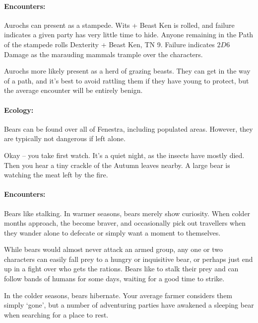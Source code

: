 \begin{multicols}{2}
\begin{boxtext}
\end{boxtext}

\paragraph{Encounters:} Aurochs can present as a stampede.  Wits + Beast Ken is rolled, and failure indicates a given party has very little time to hide.  Anyone remaining in the Path of the stampede rolls Dexterity + Beast Ken, TN 9.  Failure indicates $2D6$ Damage as the marauding mammals trample over the characters.

Aurochs more likely present as a herd of grazing beasts.  They can get in the way of a path, and it's best to avoid rattling them if they have young to protect, but the average encounter will be entirely benign.

\label{bear}

\paragraph{Ecology:} Bears can be found over all of Fenestra, including populated areas.  However, they are typically not dangerous if left alone.

\bear

\begin{boxtext}

	Okay -- you take first watch.
	It's a quiet night, as the insects have mostly died.
	Then you hear a tiny crackle of the Autumn leaves nearby.
	A large bear is watching the meat left by the fire.

\end{boxtext}

\paragraph{Encounters:} Bears like stalking.  In warmer seasons, bears merely show curiosity.  When colder months approach, the become braver, and occasionally pick out travellers when they wander alone to defecate or simply want a moment to themselves.

While bears would almost never attack an armed group, any one or two characters can easily fall prey to a hungry or inquisitive bear, or perhaps just end up in a fight over who gets the rations.  Bears like to stalk their prey and can follow bands of humans for some days, waiting for a good time to strike.

In the colder seasons, bears hibernate.  Your average farmer considers them simply `gone', but a number of adventuring parties have awakened a sleeping bear when searching for a place to rest.


\end{multicols}
